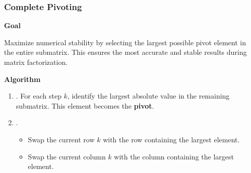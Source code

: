 \subsubsection{Complete Pivoting}

\begin{flushleft}
    \textcolor{Green3}{ \textbf{Goal}}
\end{flushleft}
Maximize numerical stability by selecting the largest possible pivot element in the entire submatrix. This ensures the most accurate and stable results during matrix factorization.

\highspace
\begin{flushleft}
    \textcolor{Green3}{ \textbf{Algorithm}}
\end{flushleft}
\begin{enumerate}
    \item {}. For each step $k$, identify the largest absolute value in the remaining submatrix. This element becomes the \textbf{pivot}.
    \item {}.
    \begin{itemize}
        \item Swap the current row $k$ with the row containing the largest element.
        \item Swap the current column $k$ with the column containing the largest element.
    \end{itemize}
\end{enumerate}

